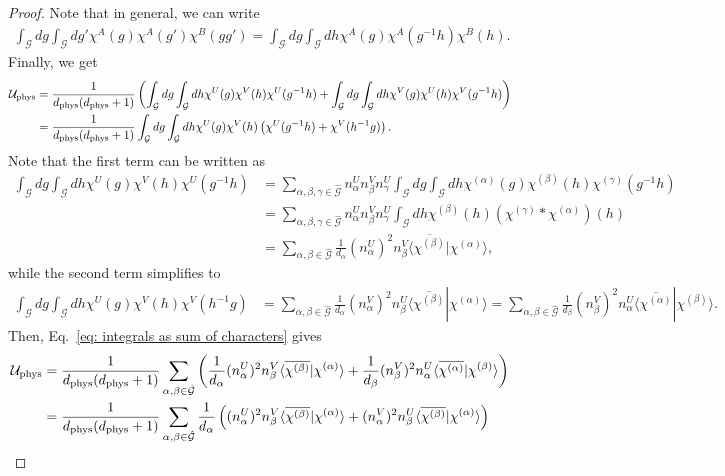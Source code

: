 \documentclass[aps,10pt,twocolumn,showpacs,pra,citeautoscript,amsmath,amssymb,floatfix,superscriptaddress]{revtex4-1}
\newcommand{\cu}{\mathcal U}
\newcommand{\cg}{\mathcal G}
\newcommand{\bracket}[2]{\langle #1|#2\rangle}
\begin{document}
\begin{proof}
Note that in general, we can write
\begin{align*}
    \int_{\cg} dg \int_\cg dg' \chi^A(g) \chi^A(g')\chi^B(gg') = \int_{\cg} dg \int_\cg dh \chi^A(g) \chi^A(g^{-1}h)\chi^B(h) .
\end{align*}
Finally, we get
\begin{align}
    \cu_{\rm phys} &= \frac{1}{d_{\rm phys} (d_{\rm phys} +1)} \left( \int_{\cg} dg \int_\cg dh \chi^U(g) \chi^V(h)\chi^U(g^{-1}h) +  \int_{\cg} dg \int_\cg dh \chi^V(g) \chi^U(h)\chi^V(g^{-1}h)  \right) \nonumber\\
    &= \frac{1}{d_{\rm phys} (d_{\rm phys} +1)}\int_{\cg} dg \int_\cg dh \chi^U(g) \chi^V(h) \left( \chi^U(g^{-1}h) + \chi^V(h^{-1}g) \right). \label{eq: integrals as sum of characters}
\end{align}
Note that the first term can be written as
\begin{align*}
    \int_{\cg} dg \int_\cg dh \chi^U(g) \chi^V(h) \chi^U(g^{-1}h) &= \sum_{\alpha, \beta, \gamma \in \hat{\cg}} n_\alpha^U n_\beta^V n_\gamma^U \int_{\cg} dg \int_\cg dh \chi^{(\alpha)}(g) \chi^{(\beta)}(h) \chi^{(\gamma)}(g^{-1}h) \nonumber\\
    &= \sum_{\alpha, \beta, \gamma \in \hat{\cg}} n_\alpha^U n_\beta^V n_\gamma^U \int_\cg dh \chi^{(\beta)}(h) (\chi^{(\gamma)} * \chi^{(\alpha)})(h) \nonumber\\ 
    &= \sum_{\alpha, \beta \in \hat{\cg}} \frac{1}{d_\alpha} (n_\alpha^U)^2 n_\beta^V \bracket{\overline{\chi^{(\beta)}}}{\chi^{(\alpha)}} ,
\end{align*}
while the second term simplifies to 
\begin{align*}
    \int_{\cg} dg \int_\cg dh \chi^U(g) \chi^V(h) \chi^V(h^{-1}g) &= \sum_{\alpha,\beta \in \hat{\cg}} \frac{1}{d_\alpha} (n_\alpha^V)^2 n_\beta^U \bracket{\overline{\chi^{(\beta)}}}{\chi^{(\alpha)}} = \sum_{\alpha,\beta \in \hat{\cg}} \frac{1}{d_\beta} (n_\beta^V)^2 n_\alpha^U \bracket{\overline{\chi^{(\alpha)}}}{\chi^{(\beta)}} .
\end{align*}
Then, Eq.~\eqref{eq: integrals as sum of characters} gives
\begin{align}
     \cu_{\rm phys} &= \frac{1}{d_{\rm phys} (d_{\rm phys} +1)} \sum_{\alpha,\beta \in \hat{\cg}} \left( \frac{1}{d_\alpha} (n_\alpha^U)^2 n_\beta^V \bracket{\overline{\chi^{(\beta)}}}{\chi^{(\alpha)}} + \frac{1}{d_\beta} (n_\beta^V)^2 n_\alpha^U \bracket{\overline{\chi^{(\alpha)}}}{\chi^{(\beta)}} \right) \nonumber\\ 
     &= \frac{1}{d_{\rm phys} (d_{\rm phys} +1)} \sum_{\alpha,\beta \in \hat{\cg}} \frac{1}{d_\alpha} \left(  (n_\alpha^U)^2 n_\beta^V \bracket{\overline{\chi^{(\beta)}}}{\chi^{(\alpha)}} + (n_\alpha^V)^2 n_\beta^U \bracket{\overline{\chi^{(\beta)}}}{\chi^{(\alpha)}} \right) \nonumber\\

\end{align}
\end{proof}
\end{document}
